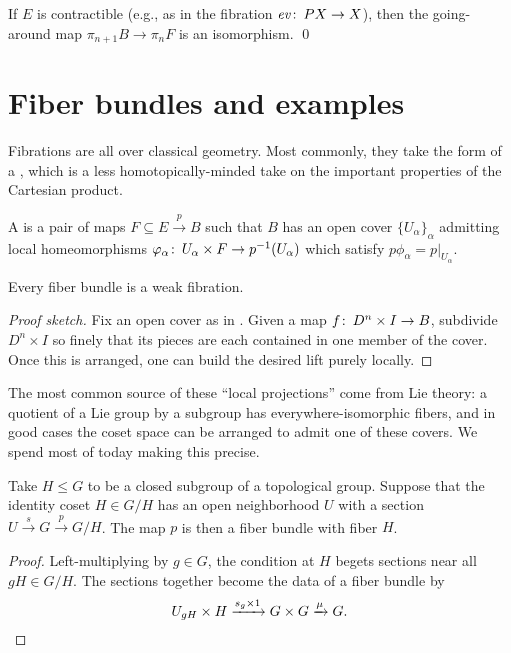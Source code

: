 \begin{corollary}\label{LoopsShiftsPi}
If $E$ is contractible (e.g., as in the fibration $\mathit{ev}\colon\thinspace PX \to X$), then the going-around map $\pi_{n+1} B \to \pi_n F$ is an isomorphism. \qed
\end{corollary}




\section{Fiber bundles and examples}

Fibrations are all over classical geometry.
Most commonly, they take the form of a , which is a less homotopically-minded take on the important properties of the Cartesian product.

\begin{definition}\label{FiberBundleDefn}%
A  is a pair of maps $F \subseteq E \xrightarrow p B$ such that $B$ has an open cover $\{U_\alpha\}_\alpha$ admitting local homeomorphisms $\varphi_\alpha\colon\thinspace U_\alpha \times F \to p^{-1}(U_\alpha)$ which satisfy $p \phi_\alpha = p|_{U_\alpha}$.
\end{definition}

\begin{lemma}
Every fiber bundle is a weak fibration.
\end{lemma}
\begin{proof}[Proof sketch]
Fix an open cover as in .  Given a map $f\colon\thinspace D^n \times I \to B$, subdivide $D^n \times I$ so finely that its pieces are each contained in one member of the cover.  Once this is arranged, one can build the desired lift purely locally.
\end{proof}

The most common source of these ``local projections'' come from Lie theory: a quotient of a Lie group by a subgroup has everywhere-isomorphic fibers, and in good cases the coset space can be arranged to admit one of these covers.
We spend most of today making this precise.

\begin{lemma}
Take $H \le G$ to be a closed subgroup of a topological group.
Suppose that the identity coset $H \in G/H$ has an open neighborhood $U$ with a section $U \xrightarrow s G \xrightarrow p G/H$.
The map $p$ is then a fiber bundle with fiber $H$.
\end{lemma}
\begin{proof}
Left-multiplying by $g \in G$, the condition at $H$ begets sections near all $gH \in G/H$.
The sections together become the data of a fiber bundle by \[U_{gH} \times H \xrightarrow{s_g \times 1} G \times G \xrightarrow\mu G. \qedhere\]
\end{proof}

